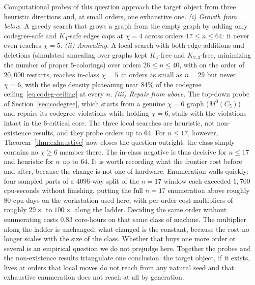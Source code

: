\documentclass[11pt]{article}
\theoremstyle{definition}
\newcommand{\chrom}{\chi}
\begin{document}
Computational probes of this question approach the target object from three
heuristic directions and, at small orders, one exhaustive one.
\emph{(i) Growth from below.} A greedy
search that grows a graph from the empty graph by adding only codegree-safe and
$K_4$-safe edges caps at $\chrom = 4$ across orders $17 \le n \le 64$: it never
even reaches $\chrom = 5$. \emph{(ii) Annealing.} A local search with both edge
additions and deletions (simulated annealing over graphs kept $K_4$-free and
$K_{2,3}$-free, minimizing the number of proper $5$-colorings) over orders
$26 \le n \le 40$, with on the order of $20{,}000$ restarts, reaches in-class
$\chrom = 5$ at orders as small as $n = 29$ but never $\chrom = 6$, with the edge
density plateauing near $84\%$ of the codegree
ceiling~\eqref{eq:codeg-ceiling} at every $n$. \emph{(iii) Repair from above.} The
top-down probe of Section~\ref{sec:codegree}, which starts from a genuine
$\chrom = 6$ graph ($M^3(C_5)$) and repairs its codegree violations while holding
$\chrom = 6$, stalls with the violations intact in the $6$-critical core. The
three local searches are heuristic, not non-existence results, and they probe
orders up to $64$. For $n \le 17$, however, Theorem~\ref{thm:exhaustive} now
closes the question outright: the class simply contains no $\chrom \ge 6$ member
there. The in-class negative is thus decisive for $n \le 17$ and heuristic
for $n$ up to $64$. It is worth recording what the frontier cost before and
after, because the change is not one of hardware. Enumeration walls quickly:
four sampled parts of a $4096$-way split of the $n = 17$ window each exceeded
$1{,}700$ cpu-seconds without finishing, putting the full $n = 17$ enumeration
above roughly $80$ cpu-days on the workstation used here, with per-order cost
multipliers of roughly $29\times$ to $100\times$ along the ladder. Deciding the
same order without enumerating costs $0.83$ core-hours on that same class of
machine. The multiplier along the ladder is unchanged; what changed is the
constant, because the cost no longer scales with the size of the class. Whether
that buys one more order or several is an empirical question we do not
prejudge here. Together the probes and the non-existence results triangulate one
conclusion: the target object, if it exists, lives at orders that local moves
do not reach from any natural seed and that exhaustive enumeration does not
reach at all by generation.
\end{document}
